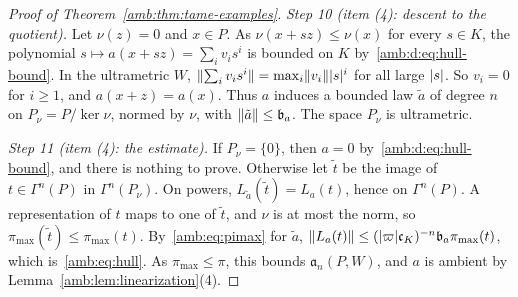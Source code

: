 \begin{proof}[Proof of Theorem~\ref{amb:thm:tame-examples}]
\emph{Step 10 (item (4): descent to the quotient).} Let $\nu(z)=0$ and $x\in P$. As $\nu(x+sz)\le\nu(x)$ for every $s\in K$, the
polynomial $s\mapsto a(x+sz)=\sum_iv_is^i$ is bounded on $K$ by~\eqref{amb:d:eq:hull-bound}. In the ultrametric $W$,
$\lVert \sum_iv_is^i\rVert=\max_i\lVert v_i\rVert\lvert s\rvert^i$ for all large $\lvert s\rvert$. So $v_i=0$ for $i\ge1$, and $a(x+z)=a(x)$. Thus $a$
induces a bounded law $\tilde a$ of degree $n$ on $P_\nu=P/\ker\nu$, normed by $\nu$, with $\lVert \tilde a\rVert\le \mathfrak b_a$. The
space $P_\nu$ is ultrametric.

\emph{Step 11 (item (4): the estimate).} If $P_\nu=\{0\}$, then $a=0$ by~\eqref{amb:d:eq:hull-bound}, and there is nothing to prove. Otherwise let $\tilde t$ be the image of $t\in\Gamma^n(P)$ in $\Gamma^n(P_\nu)$. On powers,
$L_{\tilde a}(\tilde t)=L_a(t)$, hence on $\Gamma^n(P)$. A representation of $t$ maps to one of $\tilde t$, and $\nu$ is at
most the norm, so $\pi_{\max}(\tilde t)\le\pi_{\max}(t)$. By~\eqref{amb:eq:pimax} for $\tilde a$,
$\lVert L_a(t)\rVert\le(\lvert \varpi\rvert\mathfrak c_K)^{-n}\mathfrak b_a\pi_{\max}(t)$, which is~\eqref{amb:eq:hull}. As $\pi_{\max}\le\pi$, this bounds
$\mathfrak a_n(P,W)$, and $a$ is ambient by Lemma~\ref{amb:lem:linearization}(4).
\end{proof}

